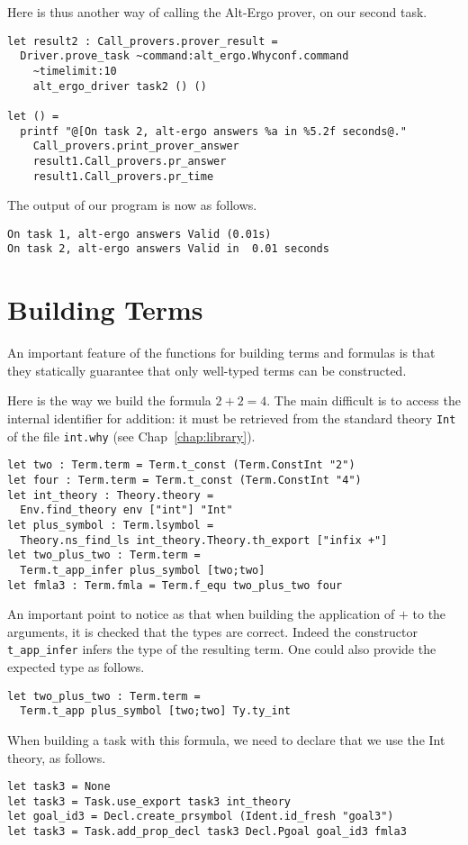 Here is thus another way of calling the Alt-Ergo prover, on our second
task.
\begin{verbatim}
let result2 : Call_provers.prover_result = 
  Driver.prove_task ~command:alt_ergo.Whyconf.command
    ~timelimit:10
    alt_ergo_driver task2 () ()

let () = 
  printf "@[On task 2, alt-ergo answers %a in %5.2f seconds@."
    Call_provers.print_prover_answer 
    result1.Call_provers.pr_answer
    result1.Call_provers.pr_time
\end{verbatim}
The output of our program is now as follows.
\begin{verbatim}
On task 1, alt-ergo answers Valid (0.01s)
On task 2, alt-ergo answers Valid in  0.01 seconds
\end{verbatim}

\section{Building Terms}

An important feature of the functions for building terms and formulas
is that they statically guarantee that only well-typed terms can be
constructed.

Here is the way we build the formula $2+2=4$. The main difficult is to
access the internal identifier for addition: it must be retrieved from
the standard theory \texttt{Int} of the file \texttt{int.why} (see
Chap~\ref{chap:library}).
\begin{verbatim}
let two : Term.term = Term.t_const (Term.ConstInt "2")
let four : Term.term = Term.t_const (Term.ConstInt "4")
let int_theory : Theory.theory = 
  Env.find_theory env ["int"] "Int"
let plus_symbol : Term.lsymbol = 
  Theory.ns_find_ls int_theory.Theory.th_export ["infix +"]
let two_plus_two : Term.term = 
  Term.t_app_infer plus_symbol [two;two] 
let fmla3 : Term.fmla = Term.f_equ two_plus_two four
\end{verbatim}
An important point to notice as that when building the application of
$+$ to the arguments, it is checked that the types are correct. Indeed
the constructor \texttt{t\_app\_infer} infers the type of the resulting
term. One could also provide the expected type as follows.
\begin{verbatim}
let two_plus_two : Term.term = 
  Term.t_app plus_symbol [two;two] Ty.ty_int
\end{verbatim}

When building a task with this formula, we need to declare that we use the Int theory, as follows.
\begin{verbatim}
let task3 = None
let task3 = Task.use_export task3 int_theory
let goal_id3 = Decl.create_prsymbol (Ident.id_fresh "goal3") 
let task3 = Task.add_prop_decl task3 Decl.Pgoal goal_id3 fmla3
\end{verbatim}

